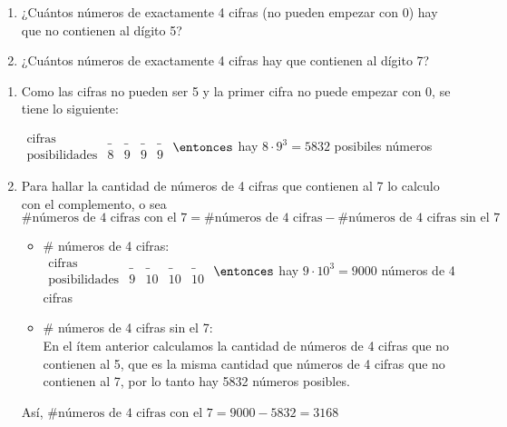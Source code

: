 \begin{enunciado}{\ejercicio}

  \begin{enumerate}[label=\alph*)]
    \item ¿Cuántos números de exactamente 4 cifras (no pueden empezar con 0) hay que no contienen al dígito 5?
    \item ¿Cuántos números de exactamente 4 cifras hay que contienen al dígito 7?
  \end{enumerate}
\end{enunciado}

\begin{enumerate}[label=\alph*)]
  \item

        Como las cifras no pueden ser 5 y la primer cifra no puede empezar con 0, se tiene lo siguiente:

        $
          \begin{array}{r|cccc}
            \text{cifras}        & \_ & \_ & \_ & \_ \\
            \text{posibilidades} & 8  & 9  & 9  & 9
          \end{array}
        $
        $\entonces$ hay $8 \cdot 9^3 = 5832$ posibiles números

  \item Para hallar la cantidad de números de 4 cifras que contienen al 7 lo calculo con el complemento, o sea\\

        $\# \text{números de 4 cifras con el 7} = \# \text{números de 4 cifras} - \# \text{números de 4 cifras sin el 7}$\\

        \begin{itemize}
          \item \# números de 4 cifras:\\

                $
                  \begin{array}{r|cccc}
                    \text{cifras}        & \_ & \_ & \_ & \_ \\
                    \text{posibilidades} & 9  & 10 & 10 & 10
                  \end{array}
                $
                $\entonces$ hay $9 \cdot 10^3 = 9000$ números de 4 cifras

          \item \# números de 4 cifras sin el 7:\\
                En el ítem anterior calculamos la cantidad de números de 4 cifras que no contienen al 5, que es la misma cantidad que números de 4 cifras que no contienen al 7, por lo tanto hay 5832 números posibles.
        \end{itemize}

        Así, $\# \text{números de 4 cifras con el 7} = 9000 - 5832 = 3168$
\end{enumerate}
